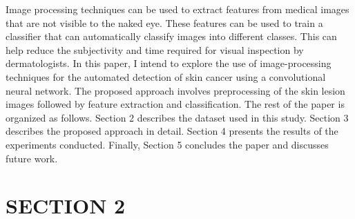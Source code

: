 \documentclass[twocolumn]{article}
\begin{document}
Image processing techniques can be used to extract features from medical images that are not visible to the naked eye. These features can be used to train a classifier that can automatically classify images into different classes. This can help reduce the subjectivity and time required for visual inspection by dermatologists.
In this paper, I intend to explore the use of image-processing techniques for the automated detection of skin cancer using a convolutional neural network. The proposed approach involves preprocessing of the skin lesion images followed by feature extraction and classification. The rest of the paper is organized as follows.  Section 2 describes the dataset used in this study. Section 3 describes the proposed approach in detail. Section 4 presents the results of the experiments conducted. Finally, Section 5 concludes the paper and discusses future work.


\section{SECTION 2}
\end{document}
